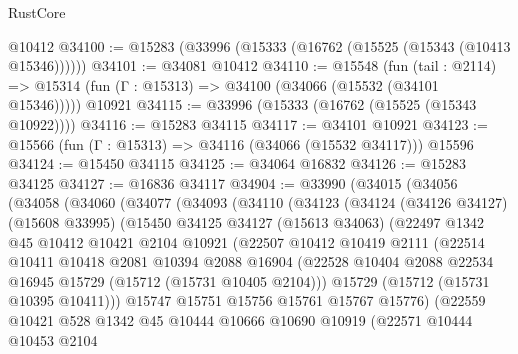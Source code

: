 \begin{lexlean}{RustCore}
\begin{coremodule}
    @10412
@34100 := @15283 (@33996 (@15333 (@16762 (@15525 (@15343 (@10413 @15346))))))
@34101 := @34081 @10412
@34110 := @15548
    (fun (tail : @2114) => @15314 (fun (Γ : @15313) => @34100 (@34066 (@15532 (@34101 @15346)))))
    @10921
@34115 := @33996 (@15333 (@16762 (@15525 (@15343 @10922))))
@34116 := @15283 @34115
@34117 := @34101 @10921
@34123 := @15566 (fun (Γ : @15313) => @34116 (@34066 (@15532 @34117))) @15596
@34124 := @15450 @34115
@34125 := @34064 @16832
@34126 := @15283 @34125
@34127 := @16836 @34117
@34904 := @33990
    (@34015
      (@34056
        (@34058
          (@34060
            (@34077
              (@34093
                (@34110
                  (@34123
                    (@34124
                      (@34126 @34127)
                      (@15608 @33995)
                      (@15450
                        @34125
                        @34127
                        (@15613 @34063)
                        (@22497
                          @1342
                          @45
                          @10412
                          @10421
                          @2104
                          @10921
                          (@22507
                            @10412
                            @10419
                            @2111
                            (@22514
                              @10411
                              @10418
                              @2081
                              @10394
                              @2088
                              @16904
                              (@22528
                                @10404
                                @2088
                                @22534
                                @16945
                                @15729
                                (@15712 (@15731 @10405 @2104)))
                              @15729
                              (@15712 (@15731 @10395 @10411)))
                            @15747
                            @15751
                            @15756
                            @15761
                            @15767
                            @15776)
                          (@22559
                            @10421
                            @528
                            @1342
                            @45
                            @10444
                            @10666
                            @10690
                            @10919
                            (@22571
                              @10444
                              @10453
                              @2104

\end{coremodule}
\end{lexlean}
